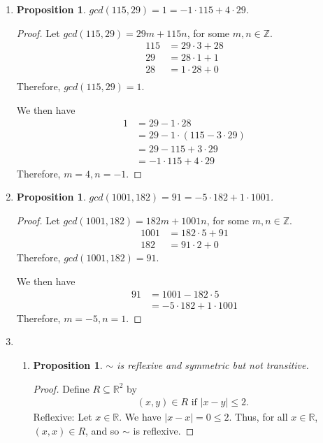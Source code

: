 \documentclass{article}
\newtheorem{prop}[thm]{Proposition}
\begin{document}
\begin{enumerate}
\item 
\begin{prop}
     $gcd(115, 29) = 1 = -1 \cdot 115 + 4 \cdot 29$.
\end{prop}
\begin{proof}
Let $gcd(115, 29) = 29m + 115n$, for some $m, n \in \mathbb{Z}$.
\begin{align}
    115 &= 29 \cdot 3  + 28 \\
    29  &= 28 \cdot 1 + 1 \\
    28  &= 1 \cdot 28 + 0 \\
\end{align}
Therefore, $gcd(115, 29) = 1$. 

We then have
\begin{align}
    1 &= 29 - 1 \cdot 28 \\
      &= 29 - 1 \cdot (115 - 3 \cdot 29) \\
      &= 29 - 115 + 3 \cdot 29 \\
      &= -1 \cdot 115 + 4 \cdot 29
\end{align}
Therefore, $m = 4, n = -1$.
\end{proof}


\item 
\begin{prop}
     $gcd(1001, 182) = 91 = -5 \cdot 182 + 1 \cdot 1001$.
\end{prop}
\begin{proof}
Let $gcd(1001, 182) = 182m + 1001n$, for some $m, n \in \mathbb{Z}$.
\begin{align}
    1001 &= 182 \cdot 5  + 91 \\
    182  &= 91 \cdot 2 + 0
\end{align}
Therefore, $gcd(1001, 182) = 91$. 

We then have
\begin{align}
    91 &= 1001 - 182 \cdot 5 \\
       &= -5 \cdot 182 + 1 \cdot 1001
\end{align}
Therefore, $m = -5, n = 1$.
\end{proof}

\item \begin{enumerate}
    
    \item \begin{prop}
        $\sim$ is reflexive and symmetric but not transitive.
    \end{prop}
    \begin{proof}
        Define $R \subseteq \mathbb{R}^2$ by
        \begin{gather}
            (x, y) \in R \text{ if } |x - y| \leq 2.
        \end{gather}
        Reflexive: Let $x \in \mathbb{R}$. We have $|x - x| = 0 \leq 2$. Thus, for all $x \in \mathbb{R}$, $(x,x) \in R$, and so $\sim$ is reflexive.


\end{proof}
\end{enumerate}
\end{enumerate}
\end{document}
